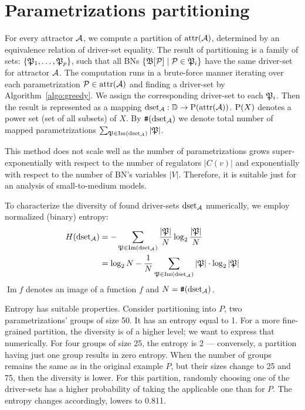 \documentclass[
	digital, oneside, nosansbold, nocolorbold, nolot, nolof
]{fithesis4}
\theoremstyle{definition}
\theoremstyle{definition}
\DeclareMathOperator{\attrf}{attr}
\DeclareMathOperator{\im}{Im}
\DeclarePairedDelimiter{\set}{\{}{\}}
\begin{document}
\section{Parametrizations partitioning}

For every attractor $\mathcal{A}$, we compute a partition of
$\attrf(\attr{A})$, determined by an equivalence relation of
driver-set equality. The result of partitioning is a family of sets:
$\set{\paronset{P}_1, \ldots, \paronset{P}_p}$, such that all BNs
$\set{\PBN{B}[\paron{P}] \mid \paron{P} \in \paronset{P}_i}$ have the same
driver-set for attractor $\mathcal{A}$. The computation runs in a brute-force
manner iterating over each parametrization $\paron{P} \in
\attrf(\attr{A})$ and finding a driver-set by
Algorithm~\ref{algo:greedy}. We assign the corresponding driver-set to each
$\mathfrak{P}_i$. Then the result is represented as a mapping $\dsetfmacro{A}:
\dsetsp \to \pset{\attrf(\attr{A})}$. $\mathrm{P}(X)$ denotes a power set (set of
all subsets) of $X$. By $\texttt{\#}(\operatorname{dset}_{\mathcal{A}})$ we denote total number of mapped
parametrizations $\sum_{\paronset{P} \in \im(\dsetfmacro{A})} |\paronset{P}|$.

This method does not scale well as the number of
parametrizations grows super-exponentially with respect to the number of
regulators $|C(v)|$ and exponentially with respect to the number of BN's
variables $|V|$. Therefore, it is suitable just for an analysis of
small-to-medium models.

To characterize the diversity of found driver-sets $\operatorname{dset}_{\mathcal{A}}$
numerically, we employ normalized (binary) entropy:
\begin{align*}
    H(\dsetfmacro{A})
    &= - \sum_{\paronset{P} \in \im(\dsetfmacro{A})}
        \frac{|\paronset{P}|}{N} \log_2 \frac{|\paronset{P}|}{N} \\
    &= \log_2 N - \frac{1}{N} \sum_{\paronset{P} \in \im(\dsetfmacro{A})}
        |\paronset{P}| \cdot \log_2 |\paronset{P}|
\end{align*}
$\im{f}$ denotes an image of a function $f$ and $N = \texttt{\#}(\operatorname{dset}_{\mathcal{A}})$.

Entropy has suitable properties. Consider partitioning into $P$, two
parametrizations' groups of size 50. It has an entropy equal to 1. For a more
fine-grained partition, the diversity is of a higher level; we want to express
that numerically. For four groups of size 25, the entropy is 2 --- conversely,
a partition having just one group results in zero entropy. When the number of
groups remains the same as in the original example $P$, but their sizes change
to 25 and 75, then the diversity is lower. For this partition, randomly
choosing one of the driver-sets has a higher probability of taking the
applicable one than for $P$. The entropy changes accordingly, lowers to 0.811.
\end{document}
